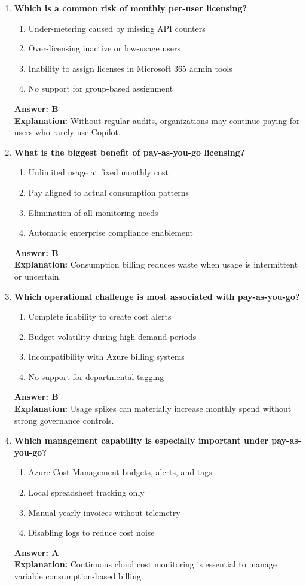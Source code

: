 \documentclass[10pt]{article}
\begin{document}
\begin{enumerate}[leftmargin=*]
\item \textbf{Which is a common risk of monthly per-user licensing?}
\begin{enumerate}[label=\Alph*.]
  \item Under-metering caused by missing API counters
  \item Over-licensing inactive or low-usage users
  \item Inability to assign licenses in Microsoft 365 admin tools
  \item No support for group-based assignment
\end{enumerate}
\textbf{Answer: B}\\
\textbf{Explanation:} Without regular audits, organizations may continue paying for users who rarely use Copilot.

\item \textbf{What is the biggest benefit of pay-as-you-go licensing?}
\begin{enumerate}[label=\Alph*.]
  \item Unlimited usage at fixed monthly cost
  \item Pay aligned to actual consumption patterns
  \item Elimination of all monitoring needs
  \item Automatic enterprise compliance enablement
\end{enumerate}
\textbf{Answer: B}\\
\textbf{Explanation:} Consumption billing reduces waste when usage is intermittent or uncertain.

\item \textbf{Which operational challenge is most associated with pay-as-you-go?}
\begin{enumerate}[label=\Alph*.]
  \item Complete inability to create cost alerts
  \item Budget volatility during high-demand periods
  \item Incompatibility with Azure billing systems
  \item No support for departmental tagging
\end{enumerate}
\textbf{Answer: B}\\
\textbf{Explanation:} Usage spikes can materially increase monthly spend without strong governance controls.

\item \textbf{Which management capability is especially important under pay-as-you-go?}
\begin{enumerate}[label=\Alph*.]
  \item Azure Cost Management budgets, alerts, and tags
  \item Local spreadsheet tracking only
  \item Manual yearly invoices without telemetry
  \item Disabling logs to reduce cost noise
\end{enumerate}
\textbf{Answer: A}\\
\textbf{Explanation:} Continuous cloud cost monitoring is essential to manage variable consumption-based billing.


\end{enumerate}
\end{document}

